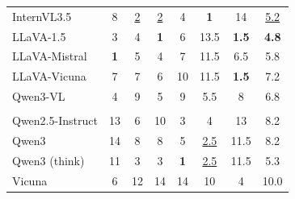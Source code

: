\begin{table}[t]
\begin{tabular}{>{\raggedright\arraybackslash}p{2.6cm}ccccccc}
\midrule
InternVL3.5 & \cellcolor{orange!30}8 & \cellcolor{gray!15}\underline{2} & \cellcolor{green!20}\underline{2} & \cellcolor{green!20}4 & \cellcolor{gray!20}\textbf{1} & 14 & \cellcolor{gray!20}\underline{5.2} \\
LLaVA-1.5 & \cellcolor{orange!30}3 & \cellcolor{gray!10}4 & \cellcolor{green!20}\textbf{1} & \cellcolor{green!20}6 & 13.5 & \cellcolor{gray!20}\textbf{1.5} & \cellcolor{gray!20}\textbf{4.8} \\
LLaVA-Mistral & \cellcolor{green!20}\textbf{1} & \cellcolor{gray!10}5 & \cellcolor{green!20}4 & \cellcolor{green!20}7 & \cellcolor{gray!5}11.5 & \cellcolor{gray!10}6.5 & \cellcolor{gray!15}5.8 \\
LLaVA-Vicuna & \cellcolor{orange!30}7 & \cellcolor{gray!10}7 & \cellcolor{green!20}6 & \cellcolor{green!20}10 & \cellcolor{gray!5}11.5 & \cellcolor{gray!20}\textbf{1.5} & \cellcolor{gray!10}7.2 \\
Qwen3-VL & \cellcolor{orange!30}4 & \cellcolor{gray!5}9 & \cellcolor{green!20}5 & \cellcolor{green!20}9 & \cellcolor{gray!15}5.5 & \cellcolor{gray!10}8 & \cellcolor{gray!10}6.8 \\
\midrule
\multicolumn{8}{c}{\textit{SA-LLMs}}\\
\midrule
Qwen2.5-Instruct & \cellcolor{gray!5}13 & \cellcolor{gray!10}6 & \cellcolor{green!20}10 & \cellcolor{green!20}3 & \cellcolor{gray!15}4 & 13 & \cellcolor{gray!10}8.2 \\
Qwen3 & 14 & \cellcolor{gray!10}8 & \cellcolor{green!20}8 & \cellcolor{green!20}5 & \cellcolor{gray!20}\underline{2.5} & \cellcolor{gray!5}11.5 & \cellcolor{gray!5}8.2 \\
Qwen3 (think) & \cellcolor{gray!10}11 & \cellcolor{gray!15}3 & \cellcolor{green!20}3 & \cellcolor{green!20}\textbf{1} & \cellcolor{gray!20}\underline{2.5} & \cellcolor{gray!5}11.5 & \cellcolor{gray!15}5.3 \\
Vicuna & \cellcolor{orange!30}6 & \cellcolor{gray!5}12 & 14 & 14 & \cellcolor{gray!5}10 & \cellcolor{gray!15}4 & 10.0 \\
\bottomrule
\end{tabular}
\end{table}

